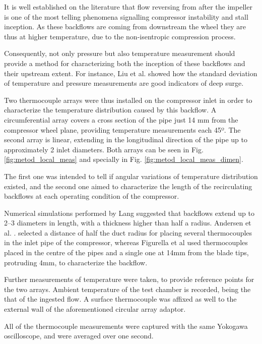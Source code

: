 It is well established on the literature \cite{koff1986axisymmetrically,galindo2008experiments} that flow reversing from after the impeller is one of the most telling phenomena signalling compressor instability and stall inception. As these backflows are coming from downstream the wheel they are thus at higher temperature, due to the non-isentropic compression process. 

Consequently, not only pressure but also temperature measurement should provide a method for characterizing both the inception of these backflows and their upstream extent. For instance, Liu et al. \cite{liu2013methods} showed how the standard deviation of temperature and pressure measurements are good indicators of deep surge.

Two thermocouple arrays were thus installed on the compressor inlet in order to characterize the temperature distribution caused by this backflow. A circumferential array covers a cross section of the pipe just 14 mm from the compressor wheel plane, providing temperature measurements each 45º. The second array is linear, extending in the longitudinal direction of the pipe up to approximately 2 inlet diameters. Both arrays can be seen in Fig. \ref{fig:metod_local_meas} and specially in Fig. \ref{fig:metod_local_meas_dimen}.

The first one was intended to tell if angular variations of temperature distribution existed, and the second one aimed to characterize the length of the recirculating backflows at each operating condition of the compressor.

Numerical simulations performed by Lang \cite{lang2011contribucion} suggested that backflows extend up to 2--3 diameters in length, with a thickness higher than half a radius. Andersen et al. \cite{andersen2009surge}. selected a distance of half the duct radius for placing several thermocouples in the inlet pipe of the compressor, whereas Figurella et al \cite{figurella2012noise} used thermocouples placed in the centre of the pipes and a single one at 14mm from the blade tips, protruding 4mm, to characterize the backflow.

Further measurements of temperature were taken, to provide reference points for the two arrays. Ambient temperature of the test chamber is recorded, being the that of the ingested flow. A surface thermocouple was affixed as well to the external wall of the aforementioned circular array adaptor.

All of the thermocouple measurements were captured with the same Yokogawa oscilloscope, and were averaged over one second.

